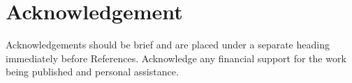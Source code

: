 \documentclass{strrespaper-journ}
\begin{document}
	\section{Acknowledgement}
		Acknowledgements should be brief and are placed under a separate heading immediately before References.
		Acknowledge any financial support for the work being published and personal assistance.

		\nocite{letcherWindEnergyEngineering2017}
		\nocite{al-shemmeriWindTurbines2010}
		\nocite{trewbyWindEnergyImplications2014}

	\printbibliography
\end{document}
